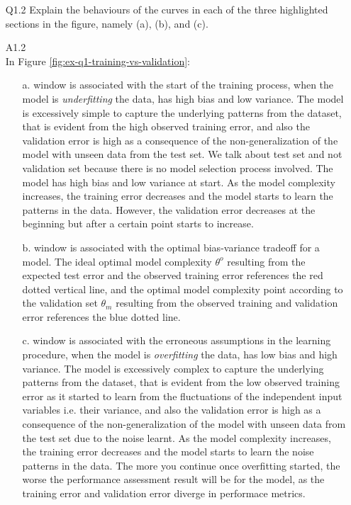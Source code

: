 \documentclass[unicode, 11pt, a4paper]{scrartcl}
\begin{document}
\begin{itemize}
	\item[Q1.2] Explain the behaviours of the curves in each of the three highlighted sections in the figure, namely (a), (b), and (c).
	\item[A1.2] ~\\
	      In Figure \ref{fig:ex-q1-training-vs-validation}:
	      \begin{itemize}
		      \item[a.] window is associated with the start of the training process,
		            when the model is \textit{underfitting} the data, has high bias and low variance.
		            The model is excessively simple to capture the underlying patterns from the dataset,
		            that is evident from the high observed training error,
		            and also the validation error is high as a consequence of the non-generalization of the model
		            with unseen data from the test set.
		            We talk about test set and not validation set
		            because there is no model selection process involved.
		            The model has high bias and low variance at start.
		            As the model complexity increases, the training error decreases
		            and the model starts to learn the patterns in the data.
		            However, the validation error decreases at the beginning
		            but after a certain point starts to increase.

		      \item[b.] window is associated with the optimal bias-variance tradeoff for a model.
		            The ideal optimal model complexity $\theta^o$
		            resulting from the expected test error and the observed training error
		            references the red dotted vertical line,
		            and the optimal model complexity point according to the validation set $\theta_m$
		            resulting from the observed training and validation error
		            references the blue dotted line.

		      \item[c.] window is associated with the erroneous assumptions in the learning procedure,
		            when the model is \textit{overfitting} the data, has low bias and high variance.
		            The model is excessively complex to capture the underlying patterns from the dataset,
		            that is evident from the low observed training error as it started to learn
		            from the fluctuations of the independent input variables i.e. their variance,
		            and also the validation error is high as a consequence of the non-generalization
		            of the model with unseen data from the test set due to the noise learnt.
		            As the model complexity increases, the training error decreases
		            and the model starts to learn the noise patterns in the data.
		            The more you continue once overfitting started, the worse the performance assessment
		            result will be for the model, as the training error and validation error diverge
		            in performace metrics.
	      \end{itemize}


\end{itemize}
\end{document}

